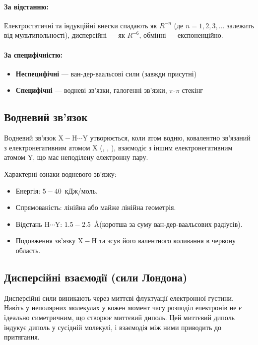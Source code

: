 \paragraph{За відстанню:}
Електростатичні та індукційні внески спадають як \(R^{-n}\) (де \(n = 1, 2, 3, \ldots\) залежить від мультипольності), дисперсійні --- як \(R^{-6}\), обмінні --- експоненційно.

\paragraph{За специфічністю:}
\begin{itemize}
    \item \textbf{Неспецифічні} --- ван-дер-ваальсові сили (завжди присутні)
    \item \textbf{Специфічні} --- водневі зв'язки, галогенні зв'язки, \(\pi\)-\(\pi\) стекінг
\end{itemize}

\subsection{Водневий зв'язок}

Водневий зв'язок \( \mathrm{X{-}H \cdots Y} \) утворюється, коли атом водню, ковалентно зв'язаний з електронегативним атомом X (, , ), взаємодіє з іншим електронегативним атомом Y, що має неподілену електронну пару.

Характерні ознаки водневого зв'язку:
\begin{itemize}
    \item Енергія: $5 - 40$~кДж/моль.
    \item Спрямованість: лінійна або майже лінійна геометрія.
    \item Відстань \( \mathrm{H \cdots Y} \): $1.5 - 2.5$~\AA (коротша за суму ван-дер-ваальсових радіусів).
    \item Подовження зв'язку \(\mathrm{X{-}H}\) та зсув його валентного коливання в червону область.
\end{itemize}

\subsection{Дисперсійні взаємодії (сили Лондона)}

Дисперсійні сили виникають через миттєві флуктуації електронної густини. Навіть у неполярних молекулах у кожен момент часу розподіл електронів не є ідеально симетричним, що створює миттєвий диполь. Цей миттєвий диполь індукує диполь у сусідній молекулі, і взаємодія між ними приводить до притягання.

